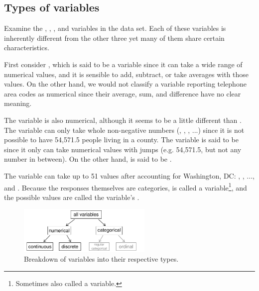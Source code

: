 \subsection{Types of variables}
\label{variableTypes}

Examine the , , , and  variables in the  data set. Each of these variables is inherently different from the other three yet many of them share certain characteristics.


First consider , which is said to be a  variable since it can take a wide range of numerical values, and it is sensible to add, subtract, or take averages with those values. On the other hand, we would not classify a variable reporting telephone area codes as numerical since their average, sum, and difference have no clear meaning.

The  variable is also numerical, although it seems to be a little different than . The variable  can only take whole non-negative numbers (, , , ...) since it is not possible to have 54,571.5 people living in a county. The variable  is said to be  since it only can take numerical values with jumps (e.g. 54,571.5, but not any number in between). On the other hand,  is said to be .

The variable  can take up to 51 values after accounting for Washington, DC: , , ..., and . Because the responses themselves are categories,  is called a  variable\footnote{Sometimes also called a  variable.}, and the possible values are called the variable's .

\begin{figure}
\centering
\includegraphics[width=0.57\textwidth]{01/figures/variables/variables}
\caption{Breakdown of variables into their respective types.}
\label{variables}
\end{figure}

